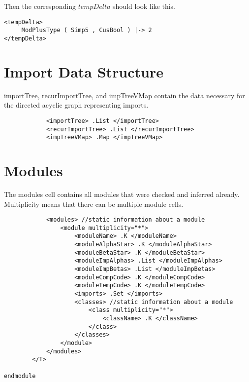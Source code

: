 Then the corresponding $tempDelta$ should look like this.

\begin{lstlisting}
<tempDelta>
     ModPlusType ( Simp5 , CusBool ) |-> 2
</tempDelta>
\end{lstlisting}

\section{Import Data Structure}

importTree, recurImportTree, and impTreeVMap contain the data necessary for the directed acyclic graph representing imports.

\begin{lstlisting}
            <importTree> .List </importTree>
            <recurImportTree> .List </recurImportTree>
            <impTreeVMap> .Map </impTreeVMap>
\end{lstlisting}

\section{Modules}

The modules cell contains all modules that were checked and inferred already. Multiplicity means that there can be multiple module cells.

\begin{lstlisting}
            <modules> //static information about a module
                <module multiplicity="*">
                    <moduleName> .K </moduleName>
                    <moduleAlphaStar> .K </moduleAlphaStar>
                    <moduleBetaStar> .K </moduleBetaStar>
                    <moduleImpAlphas> .List </moduleImpAlphas>
                    <moduleImpBetas> .List </moduleImpBetas>
                    <moduleCompCode> .K </moduleCompCode>
                    <moduleTempCode> .K </moduleTempCode>
                    <imports> .Set </imports>
                    <classes> //static information about a module
                        <class multiplicity="*">
                            <className> .K </className>
                        </class>
                    </classes>
                </module>
            </modules>
        </T>

endmodule
\end{lstlisting}